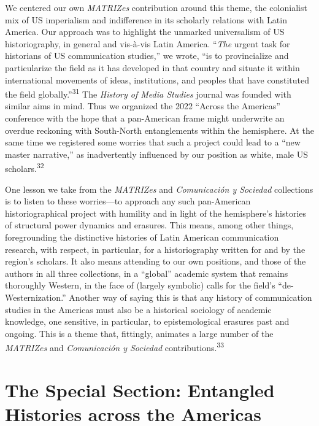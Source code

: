 \documentclass{tufte-handout}
\begin{document}
We centered our own \emph{MATRIZes} contribution around this theme, the
colonialist mix of US imperialism and indifference in its scholarly
relations with Latin America. Our approach was to highlight the unmarked
universalism of US historiography, in general and vis-à-vis Latin
America. ``\emph{The} urgent task for historians of US communication
studies,'' we wrote, ``is to provincialize and particularize the field
as it has developed in that country and situate it within international
movements of ideas, institutions, and peoples that have constituted the
field globally.''\textsuperscript{31} The
\emph{History of Media Studies} journal was founded with similar aims in
mind. Thus we organized the 2022 ``Across the Americas'' conference with
the hope that a pan-American frame might underwrite an overdue reckoning
with South-North entanglements within the hemisphere. At the same time
we registered some worries that such a project could lead to a ``new
master narrative,'' as inadvertently influenced by our position as
white, male US scholars.\textsuperscript{32}

One lesson we take from the \emph{MATRIZes} and \emph{Comunicación y
Sociedad} collections is to listen to these worries---to approach any
such pan-American historiographical project with humility and in light
of the hemisphere's histories of structural power dynamics and erasures.
This means, among other things, foregrounding the distinctive histories
of Latin American communication research, with respect, in particular,
for a historiography written for and by the region's scholars. It also
means attending to our own positions, and those of the authors in all
three collections, in a ``global'' academic system that remains
thoroughly Western, in the face of (largely symbolic) calls for the
field's ``de-Westernization.'' Another way of saying this is that any
history of communication studies in the Americas must also be a
historical sociology of academic knowledge, one sensitive, in
particular, to epistemological erasures past and ongoing. This is a
theme that, fittingly, animates a large number of the \emph{MATRIZes}
and \emph{Comunicación y Sociedad} contributions.\textsuperscript{33}

\hypertarget{the-special-section-entangled-histories-across-the-americas}{%
\section{The Special Section: Entangled Histories across the
Americas}\label{the-special-section-entangled-histories-across-the-americas}}
\end{document}
